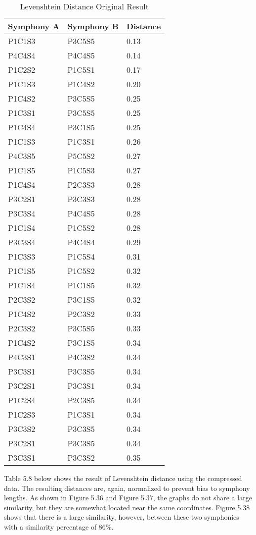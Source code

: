 \begin{longtable}{|l|l|l|}
\caption{Levenshtein Distance Original Result}
\label{my-label}\\
\hline
Symphony A & Symphony B & Distance \\ \hline
\endfirsthead
%
\endhead
%
P1C1S3 & P3C5S5 & 0.13 \\ \hline
P4C4S4 & P4C4S5 & 0.14 \\ \hline
P1C2S2 & P1C5S1 & 0.17 \\ \hline
P1C1S3 & P1C4S2 & 0.20 \\ \hline
P1C4S2 & P3C5S5 & 0.25 \\ \hline
P1C3S1 & P3C5S5 & 0.25 \\ \hline
P1C4S4 & P3C1S5 & 0.25 \\ \hline
P1C1S3 & P1C3S1 & 0.26 \\ \hline
P4C3S5 & P5C5S2 & 0.27 \\ \hline
P1C1S5 & P1C5S3 & 0.27 \\ \hline
P1C4S4 & P2C3S3 & 0.28 \\ \hline
P3C2S1 & P3C3S3 & 0.28 \\ \hline
P3C3S4 & P4C4S5 & 0.28 \\ \hline
P1C1S4 & P1C5S2 & 0.28 \\ \hline
P3C3S4 & P4C4S4 & 0.29 \\ \hline
P1C3S3 & P1C5S4 & 0.31 \\ \hline
P1C1S5 & P1C5S2 & 0.32 \\ \hline
P1C1S4 & P1C1S5 & 0.32 \\ \hline
P2C3S2 & P3C1S5 & 0.32 \\ \hline
P1C4S2 & P2C3S2 & 0.33 \\ \hline
P2C3S2 & P3C5S5 & 0.33 \\ \hline
P1C4S2 & P3C1S5 & 0.34 \\ \hline
P4C3S1 & P4C3S2 & 0.34 \\ \hline
P3C3S1 & P3C3S5 & 0.34 \\ \hline
P3C2S1 & P3C3S1 & 0.34 \\ \hline
P1C2S4 & P2C3S5 & 0.34 \\ \hline
P1C2S3 & P1C3S1 & 0.34 \\ \hline
P3C3S2 & P3C3S5 & 0.34 \\ \hline
P3C2S1 & P3C3S5 & 0.34 \\ \hline
P3C3S1 & P3C3S2 & 0.35 \\ \hline
\end{longtable}

Table 5.8 below shows the result of Levenshtein distance using the compressed data. The resulting distances are, again, normalized to prevent bias to symphony lengths. As shown in Figure 5.36 and Figure 5.37, the graphs do not share a large similarity, but they are somewhat located near the same coordinates. Figure 5.38 shows that there is a large similarity, however, between these two symphonies with a similarity percentage of 86\%.

